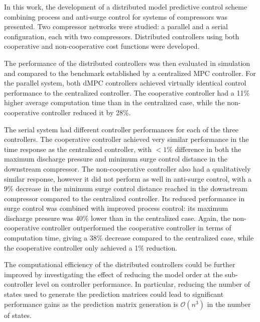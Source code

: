 \label{sec:conclusion}

In this work, the development of a distributed model predictive control scheme combining process and anti-surge control for systems of compressors was presented.
Two compressor networks were studied: a parallel and a serial configuration, each with two compressors.
Distributed controllers using both cooperative and non-cooperative cost functions were developed.

The performance of the distributed controllers was then evaluated in simulation and compared to the benchmark established by a centralized MPC controller.
For the parallel system, both dMPC controllers achieved virtually identical control performance to the centralized controller.
The cooperative controller had a 11\% higher average computation time than in the centralized case, while the non-cooperative controller reduced it by 28\%.

The serial system had different controller performances for each of the three controllers.
The cooperative controller achieved very similar performance in the time response as the centralized controller, with $<1\%$ difference in both the maximum discharge pressure and minimum surge control distance in the downstream compressor.
The non-cooperative controller also had a qualitatively similar response, however it did not perform as well in anti-surge control, with a 9\% decrease in the minimum surge control distance reached in the downstream compressor compared to the centralized controller.
Its reduced performance in surge control was combined with improved process control: its maximum discharge pressure was 40\% lower than in the centralized case.
Again, the non-cooperative controller outperformed the cooperative controller in terms of computation time, giving a 38\% decrease compared to the centralized case, while the cooperative controller only achieved a 1\% reduction.  

The computational efficiency of the distributed controllers could be further improved by investigating the effect of reducing the model order at the sub-controller level on controller performance.
In particular, reducing the number of states used to generate the prediction matrices could lead to significant performance gains as the prediction matrix generation is $\mathcal{O}(n^3)$ in the number of states.
